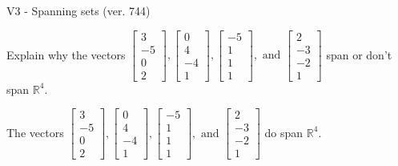 \begin{exercise}
  \begin{exerciseTitle}V3 - Spanning sets (ver. 744)\end{exerciseTitle}
  \begin{exerciseStatement}
    Explain why the vectors \(\left[\begin{array}{r}
3 \\
-5 \\
0 \\
2
\end{array}\right] , \left[\begin{array}{r}
0 \\
4 \\
-4 \\
1
\end{array}\right] , \left[\begin{array}{r}
-5 \\
1 \\
1 \\
1
\end{array}\right] , \text{ and } \left[\begin{array}{r}
2 \\
-3 \\
-2 \\
1
\end{array}\right]\) span or don't span \(\mathbb{R}^4\). 
	


  \end{exerciseStatement}
  \begin{exerciseAnswer}
   The vectors \(\left[\begin{array}{r}
3 \\
-5 \\
0 \\
2
\end{array}\right] , \left[\begin{array}{r}
0 \\
4 \\
-4 \\
1
\end{array}\right] , \left[\begin{array}{r}
-5 \\
1 \\
1 \\
1
\end{array}\right] , \text{ and } \left[\begin{array}{r}
2 \\
-3 \\
-2 \\
1
\end{array}\right]\) 
  	 do  
	span \(\mathbb{R}^4\).
  


  \end{exerciseAnswer}
\end{exercise}